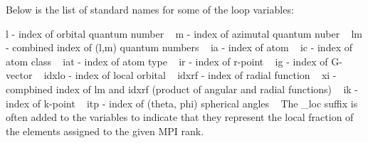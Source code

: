 Below is the list of standard names for some of the loop variables\+:

l -\/ index of orbital quantum number ~\newline
m -\/ index of azimutal quantum nuber ~\newline
lm -\/ combined index of (l,m) quantum numbers ~\newline
ia -\/ index of atom ~\newline
ic -\/ index of atom class ~\newline
iat -\/ index of atom type ~\newline
ir -\/ index of r-\/point ~\newline
ig -\/ index of G-\/vector ~\newline
idxlo -\/ index of local orbital ~\newline
idxrf -\/ index of radial function ~\newline
xi -\/ compbined index of lm and idxrf (product of angular and radial functions) ~\newline
ik -\/ index of k-\/point ~\newline
itp -\/ index of (theta, phi) spherical angles ~\newline
 The \+\_\+loc suffix is often added to the variables to indicate that they represent the local fraction of the elements assigned to the given M\+P\+I rank. 